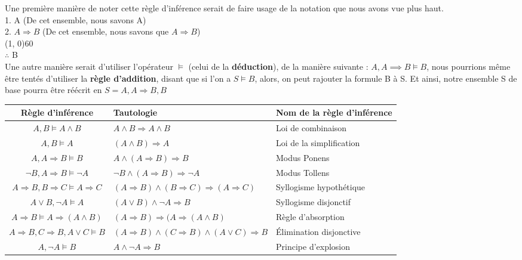 \documentclass[a4paper, 12pt]{article}
\newcommand{\imply}{\Rightarrow}
\numberwithin{equation}{subsection}
\begin{document}
  Une première manière de noter cette règle d'inférence serait de faire usage de la notation que nous avons vue plus haut. \\[0.5cm]
    1. A (De cet ensemble, nous savons A) \\
    2. $A \imply B$ (De cet ensemble, nous savons que $A \imply B$) \\
  \hspace{10cm}\line(1, 0){60} \\
  $\therefore$ B \\[0.5cm]
  Une autre manière serait d'utiliser l'opérateur $\vDash$ (celui de la {\bf déduction}), de la manière suivante : $A, A \implies B \vDash B$, nous pourrions même être tentés d'utiliser la {\bf règle d'addition}, disant que si l'on a $S \vDash B$, alors, on peut rajouter la formule B à S. Et ainsi, notre ensemble S de base pourra être réécrit en $S = {A, A \imply B, B}$
  \FloatBarrier
  \begin{adjustwidth}{300pt}{0pt}
    \begin{table}[H]
    \begin{tabular}{|c|M{5.0cm}|p{5.0cm}|}
      \hline Règle d'inférence & Tautologie & Nom de la règle d'inférence \\
      \hline $A, B \vDash A \land B$ & $A \land B \imply A \land B$& Loi de combinaison \\
      \hline $A, B \vDash A$ & $(A \land B) \imply A $& Loi de la simplification \\
      \hline $A, A \imply B \vDash B$ & $A \land (A \imply B) \imply B $ & Modus Ponens \\
      \hline $\neg B, A \imply B \vDash \neg A$ & $\neg B \land (A \imply B) \imply \neg A$ & Modus Tollens \\
      \hline $A \imply B, B \imply C \vDash A \imply C$ & $(A \imply B) \land (B \imply C) \imply (A \imply C)$ & Syllogisme hypothétique \\
      \hline $A \lor B, \neg A \vDash A$ & $(A \lor B) \land \neg A \imply B$ & Syllogisme disjonctif \\
      \hline $A \imply B \vDash A \imply (A \land B)$ & $(A \imply B) \imply (A \imply (A \land B)$ & Règle d'absorption \\
      \hline $A \imply B, C \imply B, A \lor C \vDash B$ & $(A \imply B) \land (C \imply B) \land (A \lor C) \imply B$ & Élimination disjonctive\\
      \hline $A, \neg A \vDash B$ & $A \land \neg A \imply B$ & Principe d'explosion \\
      \hline
    \end{tabular}
  \end{table}
\end{adjustwidth}
\end{document}
